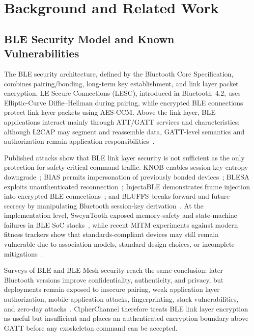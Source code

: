 \documentclass[journal]{IEEEtran}
\begin{document}
\section{Background and Related Work}
\label{sec:background}

\subsection{BLE Security Model and Known Vulnerabilities}

The BLE security architecture, defined by the Bluetooth Core Specification, combines pairing/bonding, long-term key establishment, and link layer packet encryption.
LE Secure Connections (LESC), introduced in Bluetooth~4.2, uses Elliptic-Curve Diffie--Hellman during pairing, while encrypted BLE connections protect link layer packets using AES-CCM.
Above the link layer, BLE applications interact mainly through ATT/GATT services and characteristics; although L2CAP may segment and reassemble data, GATT-level semantics and authorization remain application responsibilities~\cite{barua2022survey}.

Published attacks show that BLE link layer security is not sufficient as the only protection for safety critical command traffic.
KNOB enables session-key entropy downgrade~\cite{antonioli2020knob}; BIAS permits impersonation of previously bonded devices~\cite{antonioli2020bias}; BLESA exploits unauthenticated reconnection~\cite{wu2020blesa}; InjectaBLE demonstrates frame injection into encrypted BLE connections~\cite{cayre2021injectable}; and BLUFFS breaks forward and future secrecy by manipulating Bluetooth session-key derivation~\cite{antonioli2023bluffs}.
At the implementation level, SweynTooth exposed memory-safety and state-machine failures in BLE SoC stacks~\cite{garbelini2020sweyntooth}, while recent MITM experiments against modern fitness trackers show that standards-compliant devices may still remain vulnerable due to association models, standard design choices, or incomplete mitigations~\cite{gress2025fitness}.

Surveys of BLE and BLE Mesh security reach the same conclusion: later Bluetooth versions improve confidentiality, authenticity, and privacy, but deployments remain exposed to insecure pairing, weak application layer authorization, mobile-application attacks, fingerprinting, stack vulnerabilities, and zero-day attacks~\cite{barua2022survey,ghori2020blemesh,caesar2022survey}.
CipherChannel therefore treats BLE link layer encryption as useful but insufficient and places an authenticated encryption boundary above GATT before any exoskeleton command can be accepted.
\end{document}
